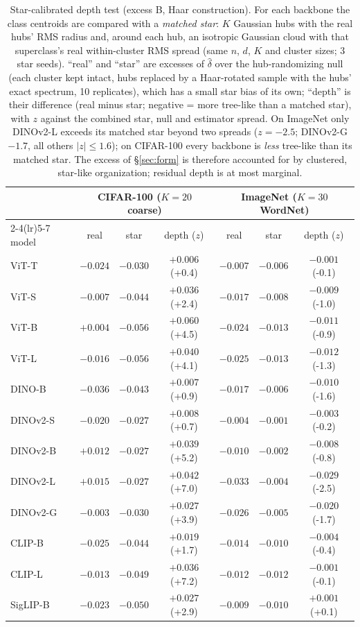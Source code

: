 \begin{table}[H]
\centering
\footnotesize
\setlength{\tabcolsep}{3.5pt}
\begin{tabular}{lccc@{\hspace{9pt}}ccc}
\toprule
 & \multicolumn{3}{c}{CIFAR-100 ($K{=}20$ coarse)} & \multicolumn{3}{c}{ImageNet ($K{=}30$ WordNet)} \\
\cmidrule(lr){2-4}\cmidrule(lr){5-7}
model & real & star & depth ($z$) & real & star & depth ($z$) \\
\midrule
ViT-T & $-0.024$ & $-0.030$ & $+0.006$ (+0.4) & $-0.007$ & $-0.006$ & $-0.001$ (-0.1) \\
ViT-S & $-0.007$ & $-0.044$ & $+0.036$ (+2.4) & $-0.017$ & $-0.008$ & $-0.009$ (-1.0) \\
ViT-B & $+0.004$ & $-0.056$ & $+0.060$ (+4.5) & $-0.024$ & $-0.013$ & $-0.011$ (-0.9) \\
ViT-L & $-0.016$ & $-0.056$ & $+0.040$ (+4.1) & $-0.025$ & $-0.013$ & $-0.012$ (-1.3) \\
DINO-B & $-0.036$ & $-0.043$ & $+0.007$ (+0.9) & $-0.017$ & $-0.006$ & $-0.010$ (-1.6) \\
DINOv2-S & $-0.020$ & $-0.027$ & $+0.008$ (+0.7) & $-0.004$ & $-0.001$ & $-0.003$ (-0.2) \\
DINOv2-B & $+0.012$ & $-0.027$ & $+0.039$ (+5.2) & $-0.010$ & $-0.002$ & $-0.008$ (-0.8) \\
DINOv2-L & $+0.015$ & $-0.027$ & $+0.042$ (+7.0) & $-0.033$ & $-0.004$ & $-0.029$ (-2.5) \\
DINOv2-G & $-0.003$ & $-0.030$ & $+0.027$ (+3.9) & $-0.026$ & $-0.005$ & $-0.020$ (-1.7) \\
CLIP-B & $-0.025$ & $-0.044$ & $+0.019$ (+1.7) & $-0.014$ & $-0.010$ & $-0.004$ (-0.4) \\
CLIP-L & $-0.013$ & $-0.049$ & $+0.036$ (+7.2) & $-0.012$ & $-0.012$ & $-0.001$ (-0.1) \\
SigLIP-B & $-0.023$ & $-0.050$ & $+0.027$ (+2.9) & $-0.009$ & $-0.010$ & $+0.001$ (+0.1) \\
\bottomrule
\end{tabular}
\caption{Star-calibrated depth test (excess B, Haar construction). For each backbone the class centroids are compared with a \emph{matched star}: $K$ Gaussian hubs with the real hubs' RMS radius and, around each hub, an isotropic Gaussian cloud with that superclass's real within-cluster RMS spread (same $n$, $d$, $K$ and cluster sizes; 3 star seeds). ``real'' and ``star'' are excesses of $\hat\delta$ over the hub-randomizing null (each cluster kept intact, hubs replaced by a Haar-rotated sample with the hubs' exact spectrum, 10 replicates), which has a small star bias of its own; ``depth'' is their difference (real minus star; negative = more tree-like than a matched star), with $z$ against the combined star, null and estimator spread. On ImageNet only DINOv2-L exceeds its matched star beyond two spreads ($z{=}-2.5$; DINOv2-G $-1.7$, all others $|z|\le1.6$); on CIFAR-100 every backbone is \emph{less} tree-like than its matched star. The excess of \S\ref{sec:form} is therefore accounted for by clustered, star-like organization; residual depth is at most marginal.}
\label{tab:b29-depth}
\end{table}
